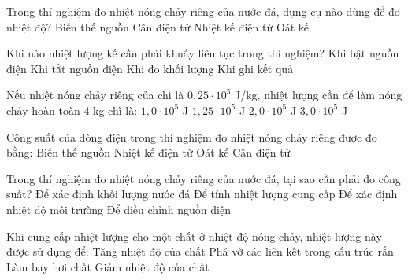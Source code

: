 \begin{ex}
Trong thí nghiệm đo nhiệt nóng chảy riêng của nước đá, dụng cụ nào dùng để đo nhiệt độ?
\choice
{Biến thế nguồn}
{Cân điện tử}
{\True Nhiệt kế điện từ}
{Oát kế}
\end{ex}

\begin{ex}
Khi nào nhiệt lượng kế cần phải khuấy liên tục trong thí nghiệm?
\choice
{\True Khi bật nguồn điện}
{Khi tắt nguồn điện}
{Khi đo khối lượng}
{Khi ghi kết quả}
\end{ex}

\begin{ex}
Nếu nhiệt nóng chảy riêng của chì là $0,25 \cdot 10^5$ J/kg, nhiệt lượng cần để làm nóng chảy hoàn toàn 4 kg chì là:
\choice
{$1,0 \cdot 10^5$ J}
{$1,25 \cdot 10^5$ J}
{\True $2,0 \cdot 10^5$ J}
{$3,0 \cdot 10^5$ J}
\end{ex}

\begin{ex}
Công suất của dòng điện trong thí nghiệm đo nhiệt nóng chảy riêng được đo bằng:
\choice
{Biến thế nguồn}
{Nhiệt kế điện từ}
{\True Oát kế}
{Cân điện tử}
\end{ex}

\begin{ex}
Trong thí nghiệm đo nhiệt nóng chảy riêng của nước đá, tại sao cần phải đo công suất?
\choice
{Để xác định khối lượng nước đá}
{\True Để tính nhiệt lượng cung cấp}
{Để xác định nhiệt độ môi trường}
{Để điều chỉnh nguồn điện}
\end{ex}

\begin{ex}
Khi cung cấp nhiệt lượng cho một chất ở nhiệt độ nóng chảy, nhiệt lượng này được sử dụng để:
\choice
{Tăng nhiệt độ của chất}
{\True Phá vỡ các liên kết trong cấu trúc rắn}
{Làm bay hơi chất}
{Giảm nhiệt độ của chất}
\end{ex}

